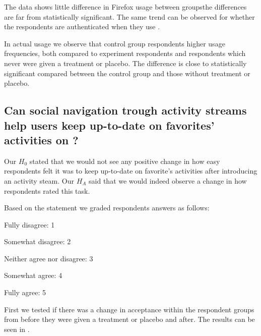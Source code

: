 The data shows little difference in Firefox usage between
groups\dash{}the differences are
far from statistically significant. The same trend can be observed for
whether the respondents are authenticated when they use \urort{}.

In actual \urort{} usage we observe that control group respondents higher
usage frequencies, both compared to experiment respondents and respondents
which never were given a treatment or placebo. The difference is close
to statistically significant compared between the control group and those
without treatment or placebo.

\subsection{%
  Can social navigation trough activity streams help users keep
  up-to-date on favorites' activities on \urort{}?
}

Our $H_0$ stated that we would not see any positive change in how easy
respondents felt it was to keep up-to-date on favorite's activities
after introducing an activity steam. Our $H_A$ said that we
would indeed observe a change in how respondents rated this task.

Based on the statement
 we graded respondents answers as follows: 

\begin{items}
  \item Fully disagree: 1
  \item Somewhat disagree: 2
  \item Neither agree nor disagree: 3
  \item Somewhat agree: 4
  \item Fully agree: 5
\end{items}

First we tested if there was a change in acceptance within the respondent
groups from before they were given a treatment or placebo and after.
The results can be seen in
.


